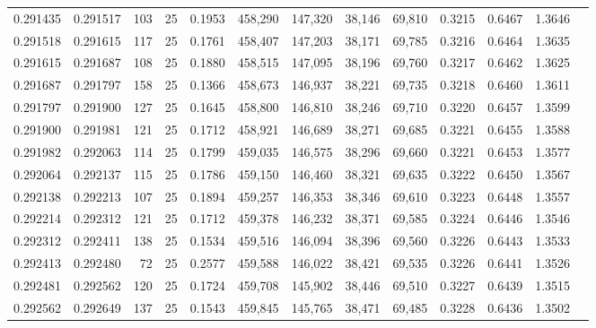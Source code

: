 \begin{tabular}{rrrrrrrrrrrrr}
0.291435 & 0.291517 &   103 &  25 &                                     0.1953 & 458,290 & 147,320 &  38,146 &  69,810 & 0.3215 & 0.6467 & 1.3646 \\
0.291518 & 0.291615 &   117 &  25 &                                     0.1761 & 458,407 & 147,203 &  38,171 &  69,785 & 0.3216 & 0.6464 & 1.3635 \\
0.291615 & 0.291687 &   108 &  25 &                                     0.1880 & 458,515 & 147,095 &  38,196 &  69,760 & 0.3217 & 0.6462 & 1.3625 \\
0.291687 & 0.291797 &   158 &  25 &                                     0.1366 & 458,673 & 146,937 &  38,221 &  69,735 & 0.3218 & 0.6460 & 1.3611 \\
0.291797 & 0.291900 &   127 &  25 &                                     0.1645 & 458,800 & 146,810 &  38,246 &  69,710 & 0.3220 & 0.6457 & 1.3599 \\
0.291900 & 0.291981 &   121 &  25 &                                     0.1712 & 458,921 & 146,689 &  38,271 &  69,685 & 0.3221 & 0.6455 & 1.3588 \\
0.291982 & 0.292063 &   114 &  25 &                                     0.1799 & 459,035 & 146,575 &  38,296 &  69,660 & 0.3221 & 0.6453 & 1.3577 \\
0.292064 & 0.292137 &   115 &  25 &                                     0.1786 & 459,150 & 146,460 &  38,321 &  69,635 & 0.3222 & 0.6450 & 1.3567 \\
0.292138 & 0.292213 &   107 &  25 &                                     0.1894 & 459,257 & 146,353 &  38,346 &  69,610 & 0.3223 & 0.6448 & 1.3557 \\
0.292214 & 0.292312 &   121 &  25 &                                     0.1712 & 459,378 & 146,232 &  38,371 &  69,585 & 0.3224 & 0.6446 & 1.3546 \\
0.292312 & 0.292411 &   138 &  25 &                                     0.1534 & 459,516 & 146,094 &  38,396 &  69,560 & 0.3226 & 0.6443 & 1.3533 \\
0.292413 & 0.292480 &    72 &  25 &                                     0.2577 & 459,588 & 146,022 &  38,421 &  69,535 & 0.3226 & 0.6441 & 1.3526 \\
0.292481 & 0.292562 &   120 &  25 &                                     0.1724 & 459,708 & 145,902 &  38,446 &  69,510 & 0.3227 & 0.6439 & 1.3515 \\
0.292562 & 0.292649 &   137 &  25 &                                     0.1543 & 459,845 & 145,765 &  38,471 &  69,485 & 0.3228 & 0.6436 & 1.3502 \\

\end{tabular}
